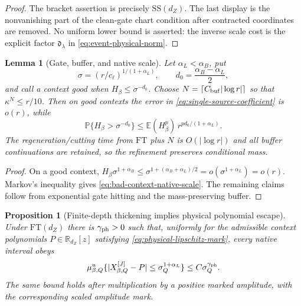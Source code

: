 \documentclass[11pt]{article}
\newtheorem{proposition}[theorem]{Proposition}
\newtheorem{lemma}[theorem]{Lemma}
\begin{document}
\begin{proof}
The bracket assertion is precisely $\mathrm{SS}(d_Z)$.  The last display is
the nonvanishing part of the clean-gate chart condition after contracted
coordinates are removed.  No uniform lower bound is asserted: the inverse
scale cost is the explicit factor $\mathfrak d_\lambda$ in
\eqref{eq:event-physical-norm}.
\end{proof}

\begin{lemma}[Gate, buffer, and native scale]
\label{lem:gate-buffer}
Let $\alpha_L<\alpha_B$, put
\begin{equation}
\label{eq:native-energy-scale}
 \sigma=(r/c_\ell)^{1/(1+\alpha_L)},\qquad
 d_0=\frac{\alpha_B-\alpha_L}{2},
\end{equation}
and call a context good when $H_\beta\le\sigma^{-d_0}$.  Choose
$N=\lceil C_{\rm buf}|\log r|\rceil$ so that
$\kappa^N\le r/10$.  Then on good contexts the error in
\eqref{eq:single-source-coefficient} is $o(r)$, while
\begin{equation}
\label{eq:bad-context-native-scale}
 \mathbb P\{H_\beta>\sigma^{-d_0}\}
 \le \mathbb E(H_\beta^p)\,r^{pd_0/(1+\alpha_L)}.
\end{equation}
The regeneration/cutting time from $\mathrm{FT}$ plus $N$ is
$O(|\log r|)$ and all buffer continuations are retained, so the refinement
preserves conditional mass.
\end{lemma}

\begin{proof}
On a good context,
$H_\beta\sigma^{1+\alpha_B}
\le\sigma^{1+(\alpha_B+\alpha_L)/2}=o(\sigma^{1+\alpha_L})=o(r)$.
Markov's inequality gives \eqref{eq:bad-context-native-scale}.  The remaining
claims follow from exponential gate hitting and the mass-preserving buffer.
\end{proof}

\begin{proposition}[Finite-depth thickening implies physical polynomial escape]
\label{prop:physical-legal-child}
Under $\mathrm{FT}(d_Z)$ there is $\gamma_{\rm ph}>0$ such that,
uniformly for the admissible context polynomials
$P\in\mathbb R_{d_Z}[z]$ satisfying
\eqref{eq:physical-lipschitz-mark}, every native interval obeys
\begin{equation}
\label{eq:local-clean-sublevel}
 \mu^u_{\beta,Q}
 \{|X^{[J]}_{\beta,Q}-P|\le\sigma_Q^{1+\alpha_L}\}
 \le C\sigma_Q^{\gamma_{\rm ph}}.
\end{equation}
The same bound holds after multiplication by a positive marked amplitude,
with the corresponding scaled amplitude mark.
\end{proposition}
\end{document}
